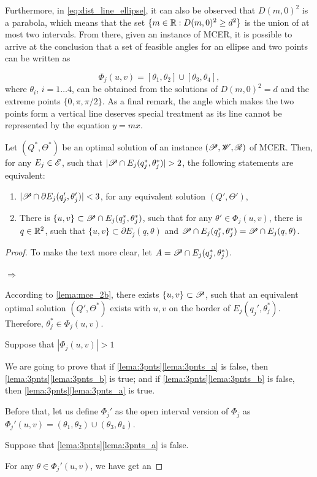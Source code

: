 Furthermore, in \autoref{eq:dist_line_ellipse}, it can also be observed that $D(m, 0)^2$ is a parabola, which means that the set $\{m\in\mathbb{R}: D(m, 0)^2 \ge d^2\}$ is the union of at most two intervals. From there, given an instance of MCER, it is possible to arrive at the conclusion that a set of feasible angles for an ellipse and two points can be written as

\begin{equation}\label{eq:phi_j}
\Phi_j(u,v) = [\theta_1, \theta_2] \cup [\theta_3, \theta_4], 
\end{equation}
where $\theta_i$, $i=1\dots 4$, can be obtained from the solutions of $D(m, 0)^2=d$ and the extreme points $\{0, \pi, \pi/2\}$.
As a final remark, the angle which makes the two points form a vertical line deserves special treatment as its line cannot be represented by the equation $y=mx$.

\begin{lema}\label{lema:3pnts}
Let $(Q^*, \Theta^*)$ be an optimal solution of an instance $(\mathscr{P}, \mathscr{W}, \mathscr{R})$ of MCER. Then, for any $E_j \in \mathscr{E}$, such that $|\Pp \cap E_j(q_j^*, \theta_j^*)|>2$, the following statements are equivalent:
	
	\begin{enumerate}[label=(\alph*)]
		\item $|\mathscr{P}\cap \partial E_j(q'_j, \theta'_j)| < 3$, for any equivalent solution $(Q', \Theta')$, \label{lema:3pnts_a}
		
		\item There is $\{u, v\}\subset\mathscr{P} \cap E_j(q_j^*, \theta_j^*)$, such that for any $\theta'\in\Phi_j(u,v)$, there is $q\in\mathbb{R}^2$, such that $\{u, v\} \subset \partial E_j(q, \theta)$ and $\mathscr{P} \cap E_j(q^*_j, \theta^*_j) = \mathscr{P} \cap E_j(q, \theta)$.\label{lema:3pnts_b}
	\end{enumerate}
\end{lema}

\begin{proof}
	To make the text more clear, let $A=\mathscr{P}\cap E_j(q^*_j, \theta^*_j)$.
	
	$\Rightarrow$
	
	According to \autoref{lema:mce_2b}, there exists $\{u, v\} \subset \mathscr{P}$, such that an equivalent optimal solution $(Q', \Theta^*)$ exists with $u, v$ on the border of $E_j(q_j', \theta_j^*)$. Therefore, $\theta_j^*\in\Phi_j(u,v)$.
	
	Suppose that $|\Phi_j(u,v)|>1$ 
	
	We are going to prove that if \autoref{lema:3pnts}\ref{lema:3pnts_a} is false, then \autoref{lema:3pnts}\ref{lema:3pnts_b} is true; and if \autoref{lema:3pnts}\ref{lema:3pnts_b} is false, then \autoref{lema:3pnts}\ref{lema:3pnts_a} is true.
	
	Before that, let us define $\Phi_j'$ as the open interval version of $\Phi_j$ as $\Phi_j'(u,v) = (\theta_1, \theta_2)\cup(\theta_3, \theta_4)$.
	
	Suppose that \autoref{lema:3pnts}\ref{lema:3pnts_a} is false.  

	
	For any $\theta\in\Phi_j'(u,v)$, we have get an 
\end{proof}

